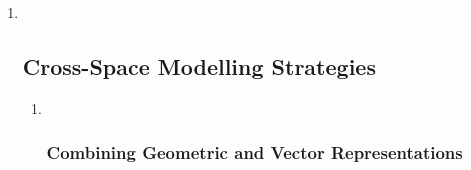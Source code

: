 \documentclass[
]{article}
\begin{document}
\begin{enumerate}
\def\labelenumi{\arabic{enumi}.}
\setcounter{enumi}{2}
\item ~
  \hypertarget{cross-space-modelling-strategies}{%
  \subsection{Cross-Space Modelling
  Strategies}\label{cross-space-modelling-strategies}}

  \begin{enumerate}
  \def\labelenumii{\arabic{enumii}.}
  \item ~
    \hypertarget{combining-geometric-and-vector-representations}{%
    \subsubsection{Combining Geometric and Vector
    Representations}\label{combining-geometric-and-vector-representations}}
  \end{enumerate}
\end{enumerate}
\end{document}
